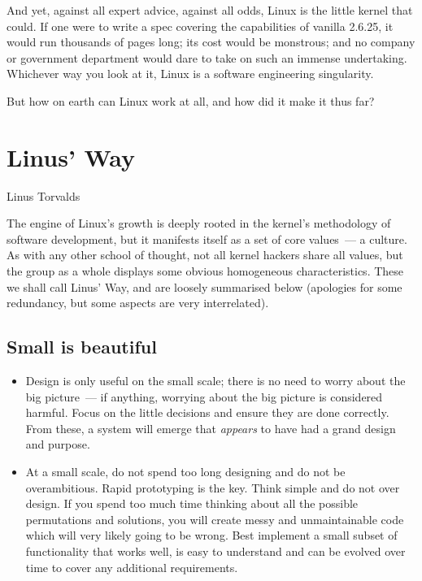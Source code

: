 \documentclass{memoir}
\begin{document}
And yet, against all expert advice, against all odds, Linux is the
little kernel that could. If one were to write a spec covering the
capabilities of vanilla 2.6.25, it would run thousands of pages long;
its cost would be monstrous; and no company or government department
would dare to take on such an immense undertaking. Whichever way you
look at it, Linux is a software engineering singularity.

But how on earth can Linux work at all, and how did it make it thus
far?

\section{Linus' Way}

\begin{epigraphs}
      {Linus Torvalds}
\end{epigraphs}

The engine of Linux's growth is deeply rooted in the kernel's
methodology of software development, but it manifests itself as a set
of core values~--- a culture. As with any other school of thought,
not all kernel hackers share all values, but the group as a whole
displays some obvious homogeneous characteristics. These we shall call
Linus' Way, and are loosely summarised below (apologies for some
redundancy, but some aspects are very interrelated).

\subsection{Small is beautiful}

\begin{itemize}
\item Design is only useful on the small scale; there is no need to
  worry about the big picture~--- if anything, worrying about the big
  picture is considered harmful. Focus on the little decisions and
  ensure they are done correctly. From these, a system will emerge
  that \emph{appears} to have had a grand design and purpose.
\item At a small scale, do not spend too long designing and do not be
  overambitious. Rapid prototyping is the key. Think simple and do not
  over design. If you spend too much time thinking about all the
  possible permutations and solutions, you will create messy and
  unmaintainable code which will very likely going to be wrong. Best
  implement a small subset of functionality that works well, is easy
  to understand and can be evolved over time to cover any additional
  requirements.
\end{itemize}
\end{document}
